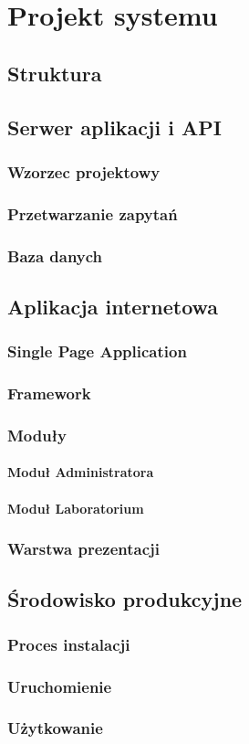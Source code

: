 \chapter{Projekt systemu}
	\section{Struktura}
	\section{Serwer aplikacji i API}
		\subsection{Wzorzec projektowy}
		\subsection{Przetwarzanie zapytań}
		\subsection{Baza danych}
	\section{Aplikacja internetowa}
		\subsection{Single Page Application}
		\subsection{Framework}
		\subsection{Moduły}
			\subsubsection{Moduł Administratora}
			\subsubsection{Moduł Laboratorium}
		\subsection{Warstwa prezentacji}
	\section{Środowisko produkcyjne}
		\subsection{Proces instalacji}
		\subsection{Uruchomienie}
		\subsection{Użytkowanie}
